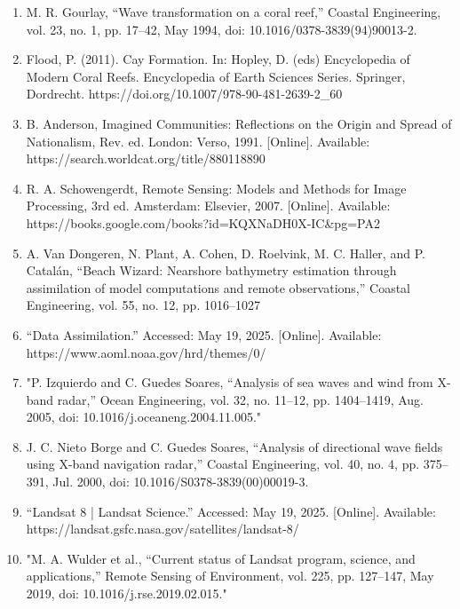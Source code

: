\documentclass{article}
\begin{document}
\begin{enumerate}
    \item{M. R. Gourlay, “Wave transformation on a coral reef,” Coastal Engineering, vol. 23, no. 1, pp. 17–42, May 1994, doi: 10.1016/0378-3839(94)90013-2.}

    \item{Flood, P. (2011). Cay Formation. In: Hopley, D. (eds) Encyclopedia of Modern Coral Reefs. Encyclopedia of Earth Sciences Series. Springer, Dordrecht. https://doi.org/10.1007/978-90-481-2639-2_60}

    \item{B. Anderson, Imagined Communities: Reflections on the Origin and Spread of Nationalism, Rev. ed. London: Verso, 1991. [Online]. Available: https://search.worldcat.org/title/880118890}


    \item{R. A. Schowengerdt, Remote Sensing: Models and Methods for Image Processing, 3rd ed. Amsterdam: Elsevier, 2007. [Online]. Available: https://books.google.com/books?id=KQXNaDH0X-IC&pg=PA2}

    \item{A. Van Dongeren, N. Plant, A. Cohen, D. Roelvink, M. C. Haller, and P. Catalán, “Beach Wizard: Nearshore bathymetry estimation through assimilation of model computations and remote observations,” Coastal Engineering, vol. 55, no. 12, pp. 1016–1027}

    \item{“Data Assimilation.” Accessed: May 19, 2025. [Online]. Available: https://www.aoml.noaa.gov/hrd/themes/0/}

    \item{"P. Izquierdo and C. Guedes Soares, “Analysis of sea waves and wind from X-band radar,” Ocean Engineering, vol. 32, no. 11–12, pp. 1404–1419, Aug. 2005, doi: 10.1016/j.oceaneng.2004.11.005."}

    \item{J. C. Nieto Borge and C. Guedes Soares, “Analysis of directional wave fields using X-band navigation radar,” Coastal Engineering, vol. 40, no. 4, pp. 375–391, Jul. 2000, doi: 10.1016/S0378-3839(00)00019-3.}

    \item{“Landsat 8 | Landsat Science.” Accessed: May 19, 2025. [Online]. Available: https://landsat.gsfc.nasa.gov/satellites/landsat-8/}

    \item{"M. A. Wulder et al., “Current status of Landsat program, science, and applications,” Remote Sensing of Environment, vol. 225, pp. 127–147, May 2019, doi: 10.1016/j.rse.2019.02.015."}


\end{enumerate}
\end{document}
